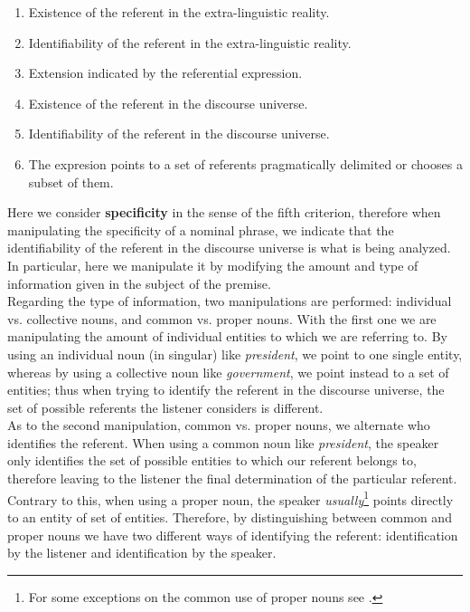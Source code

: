 \begin{enumerate}
  \item Existence of the referent in the extra-linguistic reality.
  \item Identifiability of the referent in the extra-linguistic reality.
  \item Extension indicated by the referential expression.
  \item Existence of the referent in the discourse universe.
  \item Identifiability of the referent in the discourse universe.
  \item The expresion points to a set of referents pragmatically delimited or chooses a subset of them.
\end{enumerate}

Here we consider \textbf{specificity} in the sense of the fifth criterion, therefore when manipulating the specificity of a nominal phrase, we indicate that the identifiability of the referent in the discourse universe is what is being analyzed. In particular, here we manipulate it by modifying the amount and type of information given in the subject of the premise.\\ 

Regarding the type of information, two manipulations are performed: individual vs. collective nouns, and common vs. proper nouns. With the first one we are manipulating the amount of individual entities to which we are referring to. By using an individual noun (in singular) like \textit{president}, we point to one single entity, whereas by using a collective noun like \textit{government}, we point instead to a set of entities; thus when trying to identify the referent in the discourse universe, the set of possible referents the listener considers is different.\\

As to the second manipulation, common vs. proper nouns, we alternate who identifies the referent. When using a common noun like \textit{president}, the speaker only identifies the set of possible entities to which our referent belongs to, therefore leaving to the listener the final determination of the particular referent. Contrary to this, when using a proper noun, the speaker \textit{usually}\footnote{For some exceptions on the common use of proper nouns see \citet{caudet1999expresiones}.} points directly to an entity of set of entities. Therefore, by distinguishing between common and proper nouns we have two different ways of identifying the referent: identification by the listener and identification by the speaker.\\

